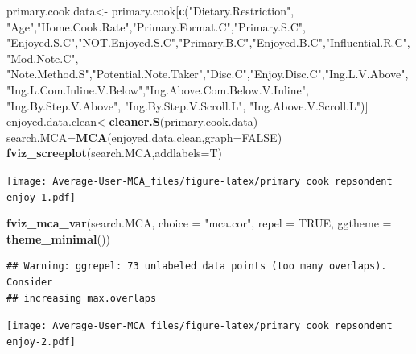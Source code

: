 \documentclass[
]{article}
\newenvironment{Shaded}{\begin{snugshade}}{\end{snugshade}}
\newcommand{\DataTypeTok}[1]{\textcolor[rgb]{0.13,0.29,0.53}{#1}}
\newcommand{\KeywordTok}[1]{\textcolor[rgb]{0.13,0.29,0.53}{\textbf{#1}}}
\newcommand{\NormalTok}[1]{#1}
\newcommand{\OtherTok}[1]{\textcolor[rgb]{0.56,0.35,0.01}{#1}}
\newcommand{\StringTok}[1]{\textcolor[rgb]{0.31,0.60,0.02}{#1}}
\begin{document}
\begin{Shaded}
\begin{Highlighting}[]
\NormalTok{primary.cook.data<-}\StringTok{ }\NormalTok{primary.cook[}\KeywordTok{c}\NormalTok{(}\StringTok{"Dietary.Restriction"}\NormalTok{, }\StringTok{"Age"}\NormalTok{,}\StringTok{"Home.Cook.Rate"}\NormalTok{,}\StringTok{"Primary.Format.C"}\NormalTok{,}\StringTok{"Primary.S.C"}\NormalTok{,}
            \StringTok{"Enjoyed.S.C"}\NormalTok{,}\StringTok{"NOT.Enjoyed.S.C"}\NormalTok{,}\StringTok{"Primary.B.C"}\NormalTok{,}\StringTok{"Enjoyed.B.C"}\NormalTok{,}\StringTok{"Influential.R.C"}\NormalTok{, }
            \StringTok{"Mod.Note.C"}\NormalTok{, }
            \StringTok{"Note.Method.S"}\NormalTok{,}\StringTok{"Potential.Note.Taker"}\NormalTok{,}\StringTok{"Disc.C"}\NormalTok{,}\StringTok{"Enjoy.Disc.C"}\NormalTok{,}\StringTok{"Ing.L.V.Above"}\NormalTok{,}
            \StringTok{"Ing.L.Com.Inline.V.Below"}\NormalTok{,}\StringTok{"Ing.Above.Com.Below.V.Inline"}\NormalTok{,  }\StringTok{"Ing.By.Step.V.Above"}\NormalTok{,  }\StringTok{"Ing.By.Step.V.Scroll.L"}\NormalTok{,}
            \StringTok{"Ing.Above.V.Scroll.L"}\NormalTok{)]}
\NormalTok{enjoyed.data.clean<-}\KeywordTok{cleaner.S}\NormalTok{(primary.cook.data)}
\NormalTok{search.MCA=}\KeywordTok{MCA}\NormalTok{(enjoyed.data.clean,}\DataTypeTok{graph=}\OtherTok{FALSE}\NormalTok{)}
\KeywordTok{fviz_screeplot}\NormalTok{(search.MCA,}\DataTypeTok{addlabels=}\NormalTok{T)}
\end{Highlighting}
\end{Shaded}

\texttt{[image: Average-User-MCA\_files/figure-latex/primary cook repsondent enjoy-1.pdf]}

\begin{Shaded}
\begin{Highlighting}[]
\KeywordTok{fviz_mca_var}\NormalTok{(search.MCA, }\DataTypeTok{choice =} \StringTok{"mca.cor"}\NormalTok{, }\DataTypeTok{repel =} \OtherTok{TRUE}\NormalTok{,}
             \DataTypeTok{ggtheme =} \KeywordTok{theme_minimal}\NormalTok{())}
\end{Highlighting}
\end{Shaded}

\begin{verbatim}
## Warning: ggrepel: 73 unlabeled data points (too many overlaps). Consider
## increasing max.overlaps
\end{verbatim}

\texttt{[image: Average-User-MCA\_files/figure-latex/primary cook repsondent enjoy-2.pdf]}
\end{document}
